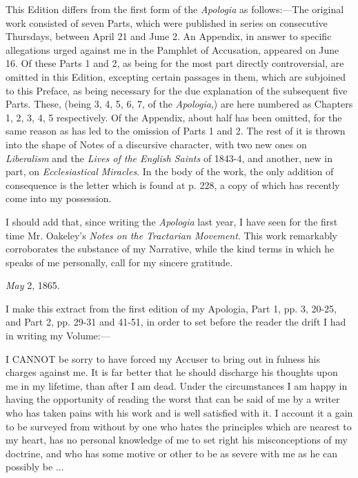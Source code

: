This Edition differs from the first form of the \emph{Apologia} as
follows:—The original work consisted of seven Parts, which were
published in series on consecutive Thursdays, between April 21 and
June 2. An Appendix, in answer to specific allegations urged against
me in the Pamphlet of Accusation, appeared on June 16. Of these Parts
1 and 2, as being for the most part directly controversial, are
omitted in this Edition, excepting certain passages in them, which are
subjoined to this Preface, as being necessary for the due explanation
of the subsequent five Parts. These, (being 3, 4, 5, 6, 7, of the \emph{Apologia},)
are here numbered as Chapters 1, 2, 3, 4, 5 respectively. Of the
Appendix, about half has been omitted, for the same reason as has led
to the omission of Parts 1 and 2. The rest of it is thrown into the
shape of Notes of a discursive character, with two new ones on \emph{Liberalism}
and the \emph{Lives of the English Saints} of 1843-4, and another, new
in part, on \emph{Ecclesiastical Miracles}. In the body of the work,
the only addition of consequence is the letter which is found
at p. 228, a copy of which has recently come into my possession.


I should add that, since writing the \emph{Apologia}
last year, I have seen for the first time Mr. Oakeley's \emph{Notes on
the Tractarian Movement}. This work remarkably corroborates the
substance of my Narrative, while the kind terms in which he speaks of
me personally, call for my sincere gratitude.


\emph{May} 2, 1865.


I make this extract from the first edition of my Apologia, Part
1, pp. 3, 20-25, and Part 2, pp. 29-31 and 41-51, in order to set before the reader the drift I had in writing my
Volume:—

I CANNOT be sorry to have forced my Accuser
to bring out in
fulness his charges against me. It is far better that he should
discharge his thoughts upon me in my lifetime, than after I am dead.
Under the circumstances I am happy in having the opportunity of
reading the worst that can be said of me by a writer who has taken
pains with his work and is well satisfied with it. I account it a gain
to be surveyed from without by one who hates the principles which are
nearest to my heart, has no personal knowledge of me to set right his
misconceptions of my doctrine, and who has some motive or other to be
as severe with me as he can possibly be ...

